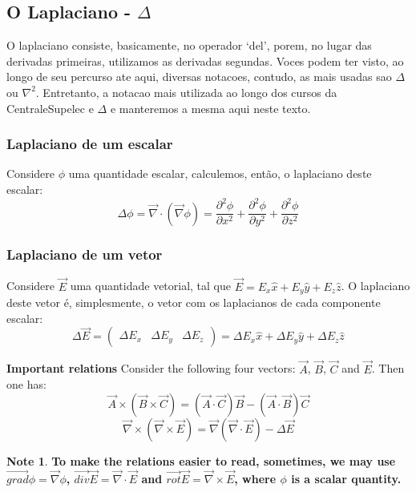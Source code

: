 \documentclass[11pt]{article}
\theoremstyle{definition}
\newtheorem{note}{Note}
\begin{document}
\subsection{O Laplaciano - $\Delta$}
O laplaciano consiste, basicamente, no operador `del', porem, no lugar das derivadas primeiras, utilizamos as derivadas segundas.
Voces podem ter visto, ao longo de seu percurso ate aqui, diversas notacoes, contudo, as mais usadas sao $\Delta$ ou $\nabla ^2$. Entretanto,
a notacao mais utilizada ao longo dos cursos da CentraleSupelec e $\Delta$ e manteremos a mesma aqui neste texto.
\subsubsection{Laplaciano de um escalar}
Considere $\phi$ uma quantidade escalar, calculemos, então, o laplaciano deste escalar:
\begin{equation}
    \Delta \phi = \vec{\nabla} \cdot \left(\vec{\nabla} \phi\right)
                = \frac{\partial^2 \phi}{\partial x^2}+\frac{\partial^2 \phi}{\partial y^2}+\frac{\partial^2 \phi}{\partial z^2}
\end{equation}
\subsubsection{Laplaciano de um vetor}
Considere $\vec{E}$ uma quantidade vetorial, tal que $\vec{E} = E_{x}\hat{x}+E_{y}\hat{y}+E_{z}\hat{z}$. O laplaciano deste vetor é, simplesmente, o vetor com os laplacianos de cada componente escalar:
\begin{equation}
    \Delta \vec{E} = \left(\begin{matrix}
                        \Delta E_{x} & \Delta E_{y} & \Delta E_{z}
                     \end{matrix}\right) = \Delta E_{x}\hat{x} + \Delta E_{y}\hat{y} + \Delta E_{z}\hat{z}
\end{equation}
\begin{shaded}
\textbf{Important relations}\newline
Consider the following four vectors: $\vec{A}$, $\vec{B}$, $\vec{C}$ and $\vec{E}$. Then one has:
\begin{equation}
\vec{A} \times \left(\vec{B} \times \vec{C}\right) = \left(\vec{A} \cdot \vec{C}\right)\vec{B} - \left(\vec{A} \cdot \vec{B}\right)\vec{C}
\end{equation}
\begin{equation}
\vec{\nabla} \times \left(\vec{\nabla} \times \vec{E}\right) = \vec{\nabla}\left(\vec{\nabla} \cdot \vec{E}\right) - \Delta \vec{E}
\end{equation}
\begin{note}
\textbf{To make the relations easier to read, sometimes, we may use $\vec{grad} \phi = \vec{\nabla}\phi$, $\vec{div} \vec{E}= \vec{\nabla} \cdot \vec{E}$ and $\vec{rot} \vec{E}= \vec{\nabla} \times \vec{E}$, where $\phi$ is a scalar quantity.}
\end{note}
\end{shaded}
\newpage
\end{document}

